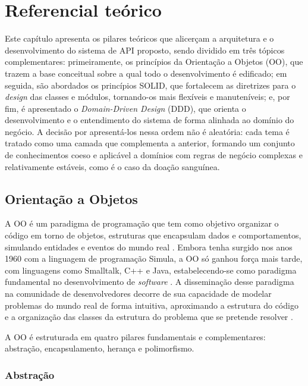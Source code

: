 ﻿\chapter{Referencial teórico}

Este capítulo apresenta os pilares teóricos que alicerçam a arquitetura e o desenvolvimento do sistema de API proposto, sendo dividido em três tópicos complementares: primeiramente, os princípios da Orientação a Objetos (OO), que trazem a base conceitual sobre a qual todo o desenvolvimento é edificado; em seguida, são abordados os princípios SOLID, que fortalecem as diretrizes para o \textit{design} das classes e módulos, tornando-os mais flexíveis e manuteníveis; e, por fim, é apresentado o \textit{Domain-Driven Design} (DDD), que orienta o desenvolvimento e o entendimento do sistema de forma alinhada ao domínio do negócio. A decisão por apresentá-los nessa ordem não é aleatória: cada tema é tratado como uma camada que complementa a anterior, formando um conjunto de conhecimentos coeso e aplicável a domínios com regras de negócio complexas e relativamente estáveis, como é o caso da doação sanguínea.

\section{Orientação a Objetos}
\label{sec:oo}

A OO é um paradigma de programação que tem como objetivo organizar o código em torno de objetos, estruturas que encapsulam dados e comportamentos, simulando entidades e eventos do mundo real \cite{sommerville2011}. Embora tenha surgido nos anos 1960 com a linguagem de programação Simula, a OO só ganhou força mais tarde, com linguagens como Smalltalk, C++ e Java, estabelecendo-se como paradigma fundamental no desenvolvimento de \textit{software} \cite{booch2007}. A disseminação desse paradigma na comunidade de desenvolvedores decorre de sua capacidade de modelar problemas do mundo real de forma intuitiva, aproximando a estrutura do código e a organização das classes da estrutura do problema que se pretende resolver \cite{sommerville2011}.

A OO é estruturada em quatro pilares fundamentais e complementares: abstração, encapsulamento, herança e polimorfismo.

\subsection{Abstração}

